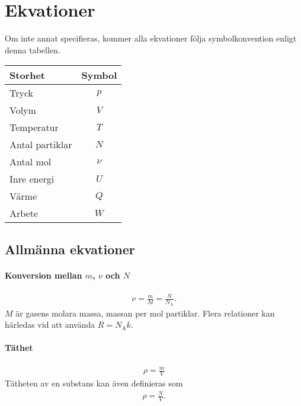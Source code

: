 \section{Ekvationer}

Om inte annat specifieras, kommer alla ekvationer följa symbolkonvention enligt denna tabellen.

\begin{table}[!h]
	\centering
	\begin{tabular}{| l | c |}
		\hline
		\textbf{Storhet} & \multicolumn{1}{|l|}{\textbf{Symbol}}\\
		\hline
		Tryck           & $p$ \\
		\hline
		Volym           & $V$ \\
		\hline
		Temperatur      & $T$ \\
		\hline
		Antal partiklar & $N$ \\
		\hline
		Antal mol       & $\nu$ \\
		\hline
		Inre energi     & $U$ \\
		\hline
		Värme           & $Q$ \\
		\hline
		Arbete          & $W$ \\
		\hline
	\end{tabular}
\end{table}

\twocolumn

\subsection{Allmänna ekvationer}

\paragraph{Konversion mellan $m$, $\nu$ och $N$}
\begin{align*}
	\nu = \frac{m}{M} = \frac{N}{N_\text{A}}.
\end{align*}
$M$ är gasens molara massa, massan per mol partiklar. Flera relationer kan härledas vid att använda $R = N_\text{A}k$.

\paragraph{Täthet}
\begin{align*}
	\rho = \frac{m}{V}
\end{align*}
Tätheten av en substans kan även definieras som
\begin{align*}
	\rho = \frac{N}{V}.
\end{align*}

